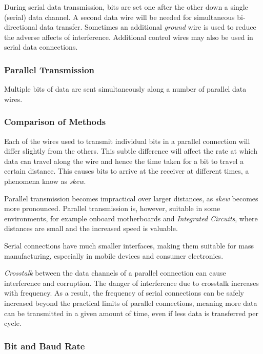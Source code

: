 \documentclass[9pt]{article}
\begin{document}
During serial data transmission, bits are set one after the other down a single (serial) data channel. A second data wire will be needed for simultaneous bi-directional data transfer. Sometimes an additional \emph{ground} wire is used to reduce the adverse affects of interference. Additional control wires may also be used in serial data connections.

\subsubsection{Parallel Transmission}
\label{sec:orgfc08d58}

Multiple bits of data are sent simultaneously along a number of parallel data wires.

\subsubsection{Comparison of Methods}
\label{sec:org9f50ace}

Each of the wires used to transmit individual bits in a parallel connection will differ slightly from the others. This subtle difference will affect the rate at which data can travel along the wire and hence the time taken for a bit to travel a certain distance. This causes bits to arrive at the receiver at different times, a phenomena know as \emph{skew}.

Parallel transmission becomes impractical over larger distances, as \emph{skew} becomes more pronounced. Parallel transmission is, however, suitable in some environments, for example onboard motherboards and \emph{Integrated Circuits}, where distances are small and the increased speed is valuable.

Serial connections have much smaller interfaces, making them suitable for mass manufacturing, especially in mobile devices and consumer electronics.

\emph{Crosstalk} between the data channels of a parallel connection can cause interference and corruption. The danger of interference due to crosstalk increases with frequency. As a result, the frequency of serial connections can be safely increased beyond the practical limits of parallel connections, meaning more data can be transmitted in a given amount of time, even if less data is transferred per cycle.

\subsubsection{Bit and Baud Rate}
\label{sec:org06deb81}
\end{document}
